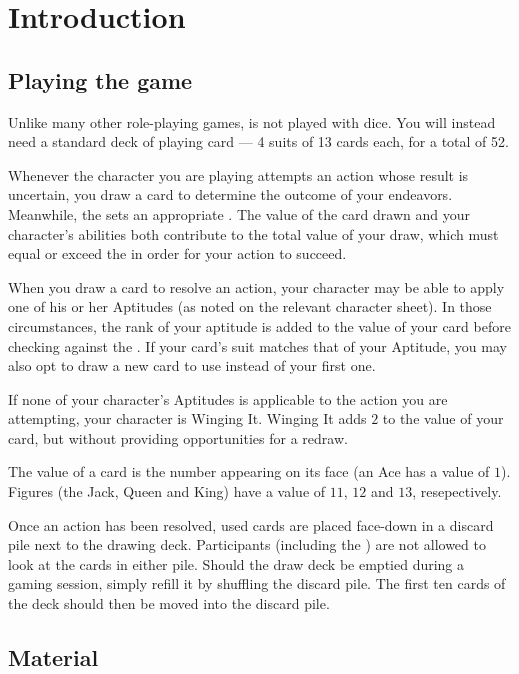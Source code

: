 \chapter{Introduction}

\section{Playing the game}

Unlike many other role-playing games, \ParadoxSpaceRPG is not played with dice.
You will instead need a standard deck of playing card --- 4 suits of 13 cards each, for a total of 52.

Whenever the character you are playing attempts an action whose result is uncertain, you draw a card to
determine the outcome of your endeavors. Meanwhile, the \GM sets an appropriate \TN.
The value of the card drawn and your character's abilities both contribute to the total value of your
draw, which must equal or exceed the \TN in order for your action to succeed.

When you draw a card to resolve an action, your character may be able to apply one of his or her Aptitudes
(as noted on the relevant character sheet). In those circumstances, the rank of your aptitude is added
to the value of your card before checking against the \TN. If your card's suit matches that of your Aptitude,
you may also opt to draw a new card to use instead of your first one.

If none of your character's Aptitudes is applicable to the action you are attempting, your character
is Winging It. Winging It adds $2$ to the value of your card, but without providing opportunities for a redraw.

The value of a card is the number appearing on its face (an Ace has a value of $1$). Figures (the Jack, Queen
and King) have a value of $11$, $12$ and $13$, resepectively.

Once an action has been resolved, used cards are placed face-down in a discard pile next to the drawing deck.
Participants (including the \GM) are not allowed to look at the cards in either pile.
Should the draw deck be emptied during a gaming session, simply refill it by shuffling the discard pile.
The first ten cards of the deck should then be moved into the discard pile.

\section{Material}

